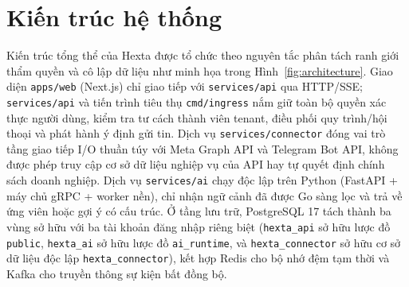 \section{Kiến trúc hệ thống}
Kiến trúc tổng thể của Hexta được tổ chức theo nguyên tắc phân tách ranh giới thẩm quyền và cô lập dữ liệu như minh họa trong Hình~\ref{fig:architecture}.
Giao diện \texttt{apps/\hspace{0pt}web} (Next.js) chỉ giao tiếp với \texttt{services/\hspace{0pt}api} qua HTTP/SSE; \texttt{services/\hspace{0pt}api} và tiến trình tiêu thụ \texttt{cmd/\hspace{0pt}ingress} nắm giữ toàn bộ quyền xác thực người dùng, kiểm tra tư cách thành viên tenant, điều phối quy trình/hội thoại và phát hành ý định gửi tin.
Dịch vụ \texttt{services/\hspace{0pt}connector} đóng vai trò tầng giao tiếp I/O thuần túy với Meta Graph API và Telegram Bot API, không được phép truy cập cơ sở dữ liệu nghiệp vụ của API hay tự quyết định chính sách doanh nghiệp.
Dịch vụ \texttt{services/\hspace{0pt}ai} chạy độc lập trên Python (FastAPI + máy chủ gRPC + worker nền), chỉ nhận ngữ cảnh đã được Go sàng lọc và trả về ứng viên hoặc gợi ý có cấu trúc.
Ở tầng lưu trữ, PostgreSQL 17 tách thành ba vùng sở hữu với ba tài khoản đăng nhập riêng biệt (\texttt{hexta\_\hspace{0pt}api} sở hữu lược đồ \texttt{public}, \texttt{hexta\_\hspace{0pt}ai} sở hữu lược đồ \texttt{ai\_\hspace{0pt}runtime}, và \texttt{hexta\_\hspace{0pt}connector} sở hữu cơ sở dữ liệu độc lập \texttt{hexta\_\hspace{0pt}connector}), kết hợp Redis cho bộ nhớ đệm tạm thời và Kafka cho truyền thông sự kiện bất đồng bộ.

